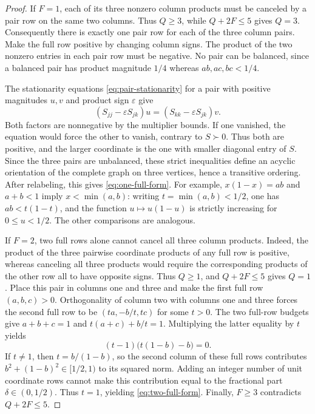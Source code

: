 \documentclass[11pt]{article}
\numberwithin{equation}{section}
\theoremstyle{definition}
\theoremstyle{definition}
\begin{document}
\begin{proof}
If $F=1$, each of its three nonzero column products must be canceled
by a pair row on the same two columns.  Thus $Q\ge3$, while
$Q+2F\le5$ gives $Q=3$.  Consequently there is exactly one pair row
for each of the three column pairs.  Make the full row positive by
changing column signs.  The product of the two nonzero entries in
each pair row must be negative.  No pair can be balanced, since a
balanced pair has product magnitude $1/4$ whereas
$ab,ac,bc<1/4$.

The stationarity equations \eqref{eq:pair-stationarity} for a pair with positive magnitudes $u,v$
and product sign $\varepsilon$ give
\[
 (S_{jj}-\varepsilon S_{jk})u
   =(S_{kk}-\varepsilon S_{jk})v.
\]
Both factors are nonnegative by the multiplier bounds.  If one
vanished, the equation would force the other to vanish, contrary to
$S\succ0$.  Thus both are positive, and the larger coordinate is the
one with smaller diagonal entry of $S$.  Since the three pairs are
unbalanced, these strict inequalities define an acyclic orientation
of the complete graph on three vertices, hence a transitive ordering.
After relabeling, this gives \eqref{eq:one-full-form}.  For example,
$x(1-x)=ab$ and $a+b<1$ imply $x<\min(a,b)$: writing
$t=\min(a,b)<1/2$, one has $ab<t(1-t)$, and the function
$u\mapsto u(1-u)$ is strictly increasing for $0\le u<1/2$.
The other comparisons are analogous.

If $F=2$, two full rows alone cannot cancel all three column products.
Indeed, the product of the three pairwise coordinate products of any
full row is positive, whereas canceling all three products would
require the corresponding products of the other row all to have
opposite signs.  Thus $Q\ge1$, and $Q+2F\le5$ gives $Q=1$.
Place this pair in columns one and three and make the first full row
$(a,b,c)>0$.  Orthogonality of column two with columns one and three
forces the second full row to be
$(ta,-b/t,tc)$ for some $t>0$.
The two full-row budgets give $a+b+c=1$ and
$t(a+c)+b/t=1$.  Multiplying the latter equality by $t$ yields
\[
 (t-1)\bigl(t(1-b)-b\bigr)=0.
\]
If $t\ne1$, then $t=b/(1-b)$, so the second column of these full rows
contributes $b^2+(1-b)^2\in[1/2,1)$ to its squared norm.
Adding an integer number of unit coordinate rows cannot make this
contribution equal to the fractional part $\delta\in(0,1/2)$.
Thus $t=1$, yielding \eqref{eq:two-full-form}.  Finally,
$F\ge3$ contradicts $Q+2F\le5$.
\end{proof}

\end{document}

